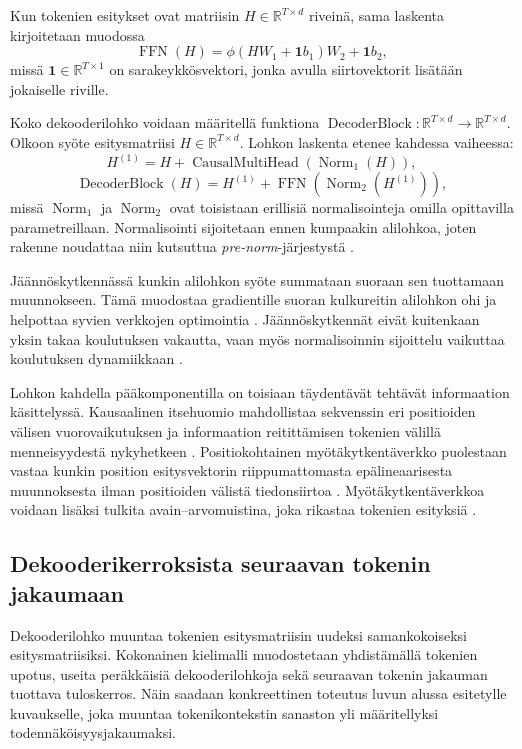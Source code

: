 Kun tokenien esitykset ovat matriisin
\(H \in \mathbb{R}^{T \times d}\) riveinä, sama laskenta
kirjoitetaan muodossa
$$
\operatorname{FFN}(H)
=
\phi\left(
  H W_1 + \mathbf{1} b_1
\right) W_2
+
\mathbf{1} b_2,
$$
missä \(\mathbf{1} \in \mathbb{R}^{T \times 1}\) on sarakeykkösvektori,
jonka avulla siirtovektorit lisätään jokaiselle riville.

Koko dekooderilohko voidaan määritellä funktiona
\(\operatorname{DecoderBlock} \colon \mathbb{R}^{T \times d} \to \mathbb{R}^{T \times d}\).
Olkoon syöte esitysmatriisi \(H \in \mathbb{R}^{T \times d}\). Lohkon laskenta
etenee kahdessa vaiheessa:
$$
H^{(1)} = H + \operatorname{CausalMultiHead}(\operatorname{Norm}_1(H)),
$$
$$
\operatorname{DecoderBlock}(H) = H^{(1)} + \operatorname{FFN}(\operatorname{Norm}_2(H^{(1)})),
$$
missä \(\operatorname{Norm}_1\) ja
\(\operatorname{Norm}_2\) ovat toisistaan erillisiä
normalisointeja omilla opittavilla parametreillaan.
Normalisointi sijoitetaan ennen kumpaakin alilohkoa, joten rakenne
noudattaa niin kutsuttua \emph{pre-norm}-järjestystä
\cite{xiong2020layer}.

Jäännöskytkennässä kunkin alilohkon syöte summataan suoraan sen
tuottamaan muunnokseen. Tämä muodostaa gradientille suoran kulkureitin
alilohkon ohi ja helpottaa syvien verkkojen optimointia
\cite{he2016deep}. Jäännöskytkennät eivät kuitenkaan yksin takaa
koulutuksen vakautta, vaan myös normalisoinnin sijoittelu vaikuttaa
koulutuksen dynamiikkaan \cite{xiong2020layer}.

Lohkon kahdella pääkomponentilla on toisiaan täydentävät tehtävät
informaation käsittelyssä. Kausaalinen itsehuomio mahdollistaa
sekvenssin eri positioiden välisen vuorovaikutuksen ja informaation
reitittämisen tokenien välillä menneisyydestä nykyhetkeen
\cite{vaswani2017attention}. Positiokohtainen myötäkytkentäverkko
puolestaan vastaa kunkin position esitysvektorin riippumattomasta
epälineaarisesta muunnoksesta ilman positioiden välistä tiedonsiirtoa
\cite{vaswani2017attention}. Myötäkytkentäverkkoa voidaan lisäksi
tulkita avain--arvomuistina, joka rikastaa tokenien esityksiä
\cite{geva2021transformer}.

\subsection{Dekooderikerroksista seuraavan tokenin jakaumaan}

Dekooderilohko muuntaa tokenien esitysmatriisin
uudeksi samankokoiseksi esitysmatriisiksi. Kokonainen kielimalli
muodostetaan yhdistämällä tokenien upotus, useita peräkkäisiä
dekooderilohkoja sekä seuraavan tokenin jakauman tuottava tuloskerros.
Näin saadaan konkreettinen toteutus luvun alussa esitetylle
kuvaukselle, joka muuntaa tokenikontekstin sanaston yli määritellyksi
todennäköisyysjakaumaksi.

